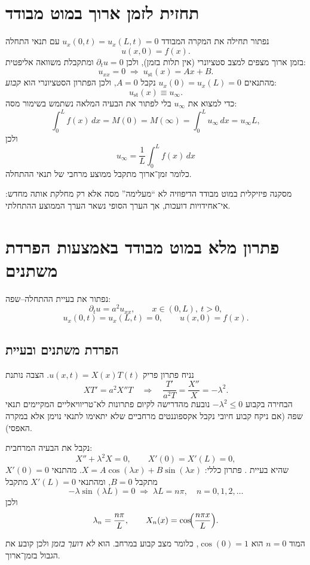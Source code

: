\section{תחזית לזמן ארוך במוט מבודד}
נפתור תחילה את המקרה המבודד \(u_x(0,t)=u_x(L,t)=0\) עם תנאי התחלה
\[
u(x,0)=f(x).
\]
בזמן ארוך מצפים למצב סטציונרי (אין תלות בזמן), ולכן \(\partial_t u=0\) ומתקבלת משוואה אליפטית:
\[
u_{xx}=0 \;\Rightarrow\; u_{\mathrm{st}}(x)=Ax+B.
\]
מהתנאים \(u_x(0)=u_x(L)=0\) נקבל \(A=0\), ולכן הפתרון הסטציונרי הוא \emph{קבוע}:
\[
u_{\mathrm{st}}(x)\equiv u_\infty.
\]
כדי למצוא את \(u_\infty\) בלי לפתור את הבעיה המלאה נשתמש בשימור מסה:
\[
\int_0^L f(x)\,dx = M(0)=M(\infty)=\int_0^L u_\infty\,dx=u_\infty L,
\]
ולכן
\[
\boxed{
u_\infty=\frac{1}{L}\int_0^L f(x)\,dx
}
\]
כלומר זמן־ארוך מתקבל ממוצע מרחבי של תנאי ההתחלה.

\begin{resultbox}{מסקנה פיזיקלית}
במוט מבודד הדיפוזיה לא ``מעלימה'' מסה אלא רק מחלקת אותה מחדש:
אי־אחידויות דועכות, אך הערך הסופי נשאר הערך הממוצע ההתחלתי.
\end{resultbox}

\section{פתרון מלא במוט מבודד באמצעות הפרדת משתנים}
נפתור את בעיית ההתחלה–שפה:
\[
\partial_t u=a^2 u_{xx},\qquad x\in(0,L),\ t>0,
\]
\[
u_x(0,t)=u_x(L,t)=0,\qquad u(x,0)=f(x).
\]

\subsection{הפרדת משתנים ובעיית }
נניח פתרון פריק \(u(x,t)=X(x)T(t)\). הצבה נותנת
\[
X T' = a^2 X'' T
\quad\Rightarrow\quad
\frac{T'}{a^2 T}=\frac{X''}{X}=-\lambda^2.
\]
הבחירה בקבוע \(-\lambda^2\le 0\) נובעת מהדרישה לקיום פתרונות לא־טריוויאליים המקיימים תנאי שפה (אם ניקח קבוע חיובי נקבל אקספוננטים מרחביים שלא יתאימו לתנאי נוימן אלא במקרה האפסי).

נקבל את הבעיה המרחבית:
\[
X''+\lambda^2 X=0,\qquad X'(0)=X'(L)=0,
\]
שהיא בעיית .
פתרון כללי: \(X=A\cos(\lambda x)+B\sin(\lambda x)\).
מהתנאי \(X'(0)=0\) מתקבל \(B=0\), ומהתנאי \(X'(L)=0\) מתקבל
\[
-\lambda \sin(\lambda L)=0 \;\Rightarrow\; \lambda L=n\pi,\quad n=0,1,2,\dots
\]
ולכן
\[
\lambda_n=\frac{n\pi}{L},\qquad X_n(x)=\cos\!\Bigl(\frac{n\pi x}{L}\Bigr).
\]

\begin{notebox}
המוד \(n=0\) הוא \(\cos(0)=1\), כלומר מצב קבוע במרחב.
הוא \emph{לא דועך בזמן} ולכן קובע את הגבול בזמן־ארוך.
\end{notebox}

